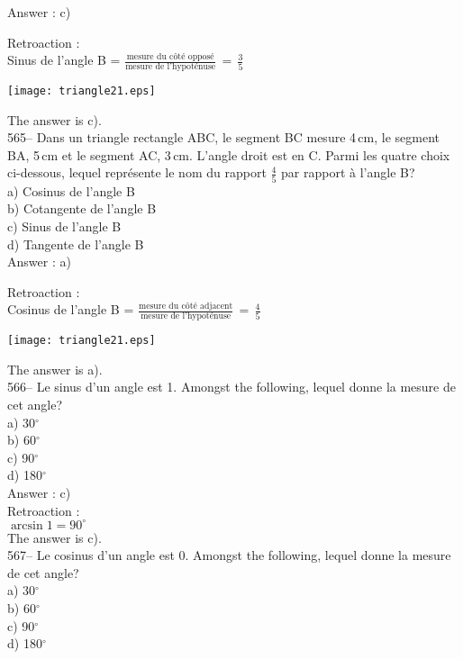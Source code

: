 ﻿\documentclass[letterpaper, 12pt]{article}
\begin{document}
Answer : c)

Retroaction : \\
Sinus de l'angle B = $\frac{\textrm{mesure du c\^ot\'e
oppos\'e}}{\textrm{mesure de
l'hypot\'enuse}}\,=\,\frac{\textrm{3}}{\textrm{5}}$\\
\begin{center}
    \texttt{[image: triangle21.eps]}
    \end{center}
The answer is c).\\

565-- Dans un triangle rectangle ABC, le segment BC mesure 4\,cm, le segment
BA, 5\,cm et le segment AC, 3\,cm.  L'angle droit est en C.  Parmi les
quatre choix ci-dessous, lequel repr\'esente le nom du rapport $\frac{4}{5}$
par rapport \`a l'angle B?\\
a) Cosinus de l'angle B\\
b) Cotangente de l'angle B\\
c) Sinus de l'angle B\\
d) Tangente de l'angle B\\

Answer : a)

Retroaction : \\
Cosinus de l'angle B = $\frac{\textrm{mesure du c\^ot\'e
adjacent}}{\textrm{mesure de
l'hypot\'enuse}}\,=\,\frac{\textrm{4}}{\textrm{5}}$\\
\begin{center}
    \texttt{[image: triangle21.eps]}
    \end{center}
The answer is a).\\

566-- Le sinus d'un angle est 1.  Amongst the following, lequel
donne la mesure de cet angle?\\
a) 30$^{\circ}$\\
b) 60$^{\circ}$\\
c) 90$^{\circ}$\\
d) 180$^{\circ}$\\

Answer : c)\\

Retroaction : \\
$\arcsin 1 = 90^{\circ}$\\
The answer is c).\\

567-- Le cosinus d'un angle est 0.  Amongst the following, lequel
donne la mesure de cet angle?\\
a) 30$^{\circ}$\\
b) 60$^{\circ}$\\
c) 90$^{\circ}$\\
d) 180$^{\circ}$\\
\end{document}
